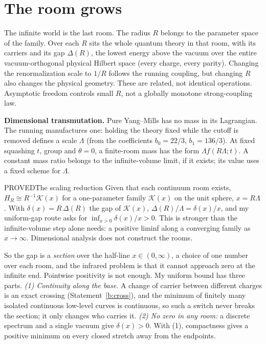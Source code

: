 \section{The room grows}

 The infinite world is the last room. The radius $R$ belongs to the parameter space of the family. Over each $R$ sits the
whole quantum theory in that room, with its carriers and its gap $\Delta(R)$, the lowest energy above the vacuum over the
entire vacuum-orthogonal physical Hilbert space (every charge, every parity). Changing the renormalization scale
to $1/R$ follows the running coupling, but changing $R$ also changes the physical geometry. These are related, not
identical operations. Asymptotic freedom controls small $R$, not a globally monotone strong-coupling law.

\textbf{Dimensional transmutation.} Pure Yang--Mills has no mass in its Lagrangian. The running manufactures one: holding
the theory fixed while the cutoff is removed defines a scale $\Lambda$ (from the coefficients $b_0=22/3$, $b_1=136/3$).
At fixed squashing $t$, group and $\theta=0$, a finite-room mass has the form $\Lambda f(R\Lambda;t)$.
A constant mass ratio belongs to the infinite-volume limit, if it exists; its value uses a fixed scheme for $\Lambda$.

\begin{claim}{PROVED}{The scaling reduction}\label{b:scaling}
Given that each continuum room exists, $H_R\cong R^{-1}\mathcal K(x)$ for a one-parameter family $\mathcal K(x)$ on the
unit sphere, $x=R\Lambda$. With $\delta(x)=R\,\Delta(R)$ the gap of $\mathcal K(x)$, $\Delta(R)/\Lambda=\delta(x)/x$, and
my uniform-gap route asks for $\inf_{x>0}\delta(x)/x>0$. This is stronger than the infinite-volume step alone needs:
a positive liminf along a converging family as $x\to\infty$. Dimensional analysis does not construct the rooms.
\end{claim}

So the gap is a \emph{section} over the half-line $x\in(0,\infty)$, a choice of one number over each room, and the
infrared problem is that it cannot approach zero at the infinite end. Pointwise positivity is not enough.
My uniform bound has three parts.
\emph{(1) Continuity along the base.} A change of carrier between different charges is an exact crossing
(Statement~\ref{b:cross}), and the minimum of finitely many isolated continuous low-level curves is continuous, so such a switch never breaks the section; it
only changes who carries it. \emph{(2) No zero in any room:} a discrete spectrum and a single vacuum give $\delta(x)>0$.
With (1), compactness gives a positive minimum on every closed stretch away from the endpoints.

